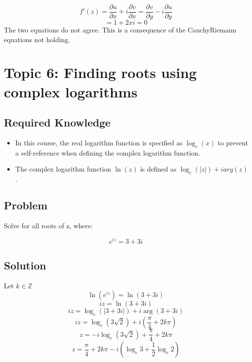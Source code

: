 \documentclass[12pt]{article}
\newcommand{\integer}{\mathbb{Z}}
\begin{document}
\begin{equation}
    f\prime(z)=\frac{\partial u}{\partial x}+i\frac{\partial v}{\partial x}=\frac{\partial v}{\partial y}-i\frac{\partial u}{\partial y}
\end{equation}
\begin{equation}
    =1+2xi=0
\end{equation}
The two equations do not agree.  This is a consequence of the Cauchy\-Riemann equations not holding.

\section{Topic 6: Finding roots using complex logarithms}
\subsection{Required Knowledge}
\begin{itemize}
    \item In this course, the real logarithm function is specified as $\log_e(x)$ to prevent a self-reference when defining the complex logarithm function.
    \item The complex logarithm function $\ln(z)$ is defined as $\log_e(|z|)+iarg(z)$.
\end{itemize}
\subsection{Problem}
Solve for all roots of z, where:

\begin{equation}
    e^{iz}=3+3i
\end{equation}
\subsection{Solution}
Let $k\in\integer$
\begin{equation}
    \ln(e^{iz})=\ln(3+3i)
\end{equation}
\begin{equation}
    iz=\ln(3+3i)
\end{equation}
\begin{equation}
    iz=\log_e(|3+3i|)+i\arg(3+3i)
\end{equation}
\begin{equation}
    iz=\log_e(3\sqrt{2})+i(\frac{\pi}{4}+2k\pi)
\end{equation}
\begin{equation}
    z=-i\log_e(3\sqrt{2})+\frac{\pi}{4}+2k\pi
\end{equation}
\begin{equation}
    z=\frac{\pi}{4}+2k\pi-i(\log_e{3}+\frac{1}{2}\log_e{2})
\end{equation}
\end{document}
